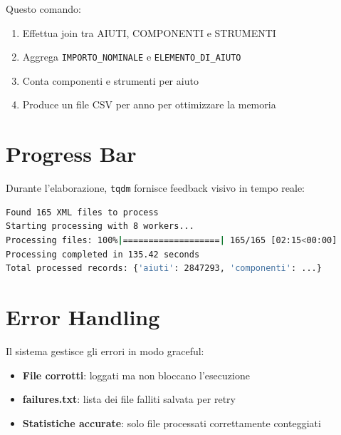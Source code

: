 Questo comando:
\begin{enumerate}
    \item Effettua join tra AIUTI, COMPONENTI e STRUMENTI
    \item Aggrega \texttt{IMPORTO\_NOMINALE} e \texttt{ELEMENTO\_DI\_AIUTO}
    \item Conta componenti e strumenti per aiuto
    \item Produce un file CSV per anno per ottimizzare la memoria
\end{enumerate}

\section{Progress Bar}

Durante l'elaborazione, \texttt{tqdm} fornisce feedback visivo in tempo reale:

\begin{lstlisting}[language=bash, caption=Output con progress bar]
Found 165 XML files to process
Starting processing with 8 workers...
Processing files: 100%|===================| 165/165 [02:15<00:00]
Processing completed in 135.42 seconds
Total processed records: {'aiuti': 2847293, 'componenti': ...}
\end{lstlisting}

\section{Error Handling}

Il sistema gestisce gli errori in modo graceful:

\begin{itemize}
    \item \textbf{File corrotti}: loggati ma non bloccano l'esecuzione
    \item \textbf{failures.txt}: lista dei file falliti salvata per retry
    \item \textbf{Statistiche accurate}: solo file processati correttamente conteggiati
\end{itemize}
